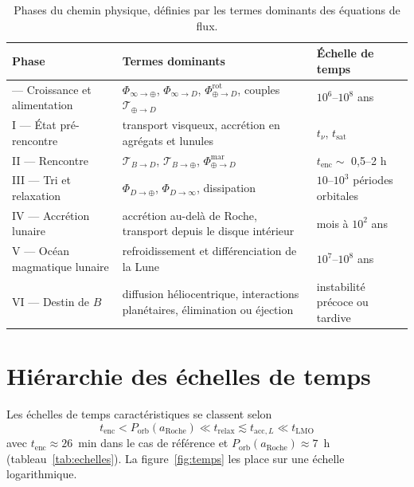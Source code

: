 \documentclass[11pt,a4paper,openany]{report}
\newcommand{\aR}{a_{\mathrm{Roche}}}
\begin{document}
\begin{table}[htbp]
\centering
\small
\caption{Phases du chemin physique, définies par les termes dominants des équations de flux.}
\label{tab:phases}
\begin{tabularx}{\textwidth}{>{\raggedright\arraybackslash}p{3.1cm}
>{\raggedright\arraybackslash}X >{\raggedright\arraybackslash}p{3.6cm}}
\toprule
\textbf{Phase} & \textbf{Termes dominants} & \textbf{Échelle de temps} \\
\midrule
0 --- Croissance et alimentation & $\Phi_{\infty\to\oplus}$, $\Phi_{\infty\to D}$, $\Phi^{\mathrm{rot}}_{\oplus\to D}$, couples $\mathcal{T}_{\oplus\to D}$ & $10^{6}$--$10^{8}$ ans \\
I --- État pré-rencontre & transport visqueux, accrétion en agrégats et lunules & $t_\nu$, $t_{\mathrm{sat}}$ \\
II --- Rencontre & $\mathcal{T}_{B\to D}$, $\mathcal{T}_{B\to\oplus}$, $\Phi^{\mathrm{mar}}_{\oplus\to D}$ & $t_{\mathrm{enc}}\sim$ 0,5--2 h \\
III --- Tri et relaxation & $\Phi_{D\to\oplus}$, $\Phi_{D\to\infty}$, dissipation & $10$--$10^{3}$ périodes orbitales \\
IV --- Accrétion lunaire & accrétion au-delà de Roche, transport depuis le disque intérieur & mois à $10^{2}$ ans \\
V --- Océan magmatique lunaire & refroidissement et différenciation de la Lune & $10^{7}$--$10^{8}$ ans \\
VI --- Destin de $B$ & diffusion héliocentrique, interactions planétaires, élimination ou éjection & instabilité précoce ou tardive \\
\bottomrule
\end{tabularx}
\end{table}

\section{Hiérarchie des échelles de temps}

Les échelles de temps caractéristiques se classent selon
\begin{equation}
\boxed{\;t_{\mathrm{enc}}<P_{\mathrm{orb}}(\aR)\ll t_{\mathrm{relax}}\lesssim t_{\mathrm{acc},L}
\ll t_{\mathrm{LMO}}\;}
\label{eq:hierarchie-temps}
\end{equation}
avec $t_{\mathrm{enc}}\approx26$~min dans le cas de référence et $P_{\mathrm{orb}}(\aR)\approx7$~h
(tableau~\ref{tab:echelles}). La figure~\ref{fig:temps} les place sur une échelle logarithmique.
\end{document}
